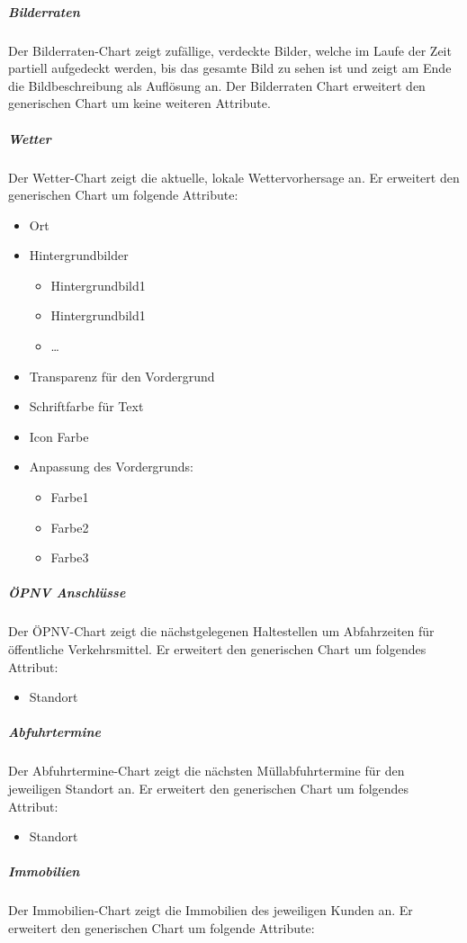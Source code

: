 \documentclass[a4paper]{article}
\begin{document}
	\subparagraph{Bilderraten}
	Der Bilderraten-Chart zeigt zufällige, verdeckte Bilder, welche im Laufe der Zeit partiell aufgedeckt werden, bis das gesamte Bild zu sehen ist und zeigt am Ende die Bildbeschreibung als Auflösung an.
	Der Bilderraten Chart erweitert den generischen Chart um keine weiteren Attribute.
	\pagebreak
	\subparagraph{Wetter}
	Der Wetter-Chart zeigt die aktuelle, lokale Wettervorhersage an.
	Er erweitert den generischen Chart um folgende Attribute:
	\begin{itemize}
	\item Ort
	\item Hintergrundbilder
		\begin{itemize}
		\item Hintergrundbild1
		\item Hintergrundbild1
		\item …
		\end{itemize}
	\item Transparenz für den Vordergrund
	\item Schriftfarbe für Text
	\item Icon Farbe
	\item Anpassung des Vordergrunds:
		\begin{itemize}
		\item Farbe1
		\item Farbe2
		\item Farbe3
		\end{itemize}
	\end{itemize}
	\subparagraph{ÖPNV Anschlüsse}
	Der ÖPNV-Chart zeigt die nächstgelegenen Haltestellen um Abfahrzeiten für öffentliche Verkehrsmittel.
	Er erweitert den generischen Chart um folgendes Attribut:
	\begin{itemize}
	\item Standort
	\end{itemize}
	\subparagraph{Abfuhrtermine}
	Der Abfuhrtermine-Chart zeigt die nächsten Müllabfuhrtermine für den jeweiligen Standort an.
	Er erweitert den generischen Chart um folgendes Attribut:
	\begin{itemize}
	\item Standort
	\end{itemize}
	\pagebreak
	\subparagraph{Immobilien}
	Der Immobilien-Chart zeigt die Immobilien des jeweiligen Kunden an.
	Er erweitert den generischen Chart um folgende Attribute:
\end{document}
